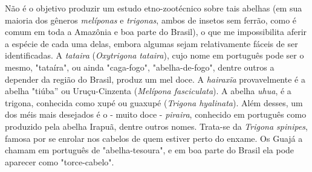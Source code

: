
Não é o objetivo produzir um estudo etno-zootécnico sobre tais abelhas
(em sua maioria dos gêneros \emph{melíponas} e \emph{trigonas}, ambos de
insetos sem ferrão, como é comum em toda a Amazônia e boa parte do
Brasil), o que me impossibilita aferir a espécie de cada uma delas,
embora algumas sejam relativamente fáceis de ser identificadas. A
\emph{tataira} (\emph{Oxytrigona} \emph{tataira}), cujo nome em
português pode ser o mesmo, "tataíra", ou ainda "caga-fogo",
"abelha-de-fogo", dentre outros a depender da região do Brasil, produz
um mel doce. A \emph{hairaxĩa} provavelmente é a abelha "tiúba'' ou
Uruçu-Cinzenta (\emph{Melípona fasciculata}). A abelha \emph{uhua}, é a
trigona, conhecida como xupé ou guaxupé (\emph{Trigona hyalinata}). Além
desses, um dos méis mais desejados é o - muito doce - \emph{piraira},
conhecido em português como produzido pela abelha Irapuã, dentre outros
nomes. Trata-se da \emph{Trigona spinipes}, famosa por se enrolar nos
cabelos de quem estiver perto do enxame. Os Guajá a chamam em português
de "abelha-tesoura", e em boa parte do Brasil ela pode aparecer como
"torce-cabelo".

